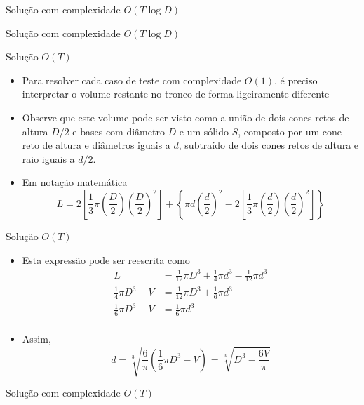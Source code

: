 \begin{frame}[fragile]{Solução com complexidade $O(T\log D)$}
\end{frame}

\begin{frame}[fragile]{Solução com complexidade $O(T\log D)$}
\end{frame}


\begin{frame}[fragile]{Solução $O(T)$}

    \begin{itemize}
        \item Para resolver cada caso de teste com complexidade $O(1)$, é preciso 
            interpretar o volume restante no tronco de forma ligeiramente diferente

        \item Observe que este volume pode ser visto como a união de dois cones retos de 
            altura $D/2$ e bases com
            diâmetro $D$ e um sólido $S$, composto por um cone reto de altura e diâmetros iguais a
            $d$, subtraído de dois cones retos de altura e raio iguais a $d/2$.

        \item Em notação matemática
        \[
            L = 2\left[\frac{1}{3}\pi\left(\frac{D}{2}\right)\left(\frac{D}{2}\right)^2\right]
            + \left\lbrace \pi d\left(\frac{d}{2}\right)^2 
            -2\left[\frac{1}{3}\pi\left(\frac{d}{2}\right)\left(\frac{d}{2}\right)^2\right] \right\rbrace
        \]
    \end{itemize}

\end{frame}

\begin{frame}[fragile]{Solução $O(T)$}

    \begin{itemize}
        \item Esta expressão pode ser reescrita como
        \begin{align*}
            L &= \frac{1}{12}\pi D^3 + \frac{1}{4}\pi d^3 - \frac{1}{12}\pi d^3 \\
            \frac{1}{4}\pi D^3 - V &= \frac{1}{12}\pi D^3 + \frac{1}{6}\pi d^3 \\
            \frac{1}{6}\pi D^3 - V &= \frac{1}{6}\pi d^3 \\
        \end{align*}
 
        \item Assim,
        \[
            d = \sqrt[3]{\frac{6}{\pi}\left(\frac{1}{6}\pi D^3 - V\right)} =
            \sqrt[3]{D^3 - \frac{6V}{\pi}}
        \]
    \end{itemize}

\end{frame}

\begin{frame}[fragile]{Solução com complexidade $O(T)$}
\end{frame}
